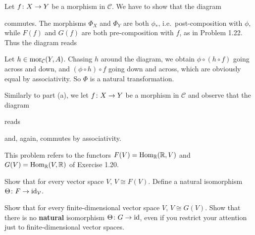 \bs
\ben[label=(\alph*)]
\item Let $f\colon X\to Y$ be a morphism in $\mathcal{C}$. We have to show that the diagram
\bse
{}
\ese
commutes. The morphisms $\Phi_X$ and $\Phi_Y$ are both $\phi_*$, i.e.\ post-composition with $\phi$, while $F(f)$ and $G(f)$ are both pre-composition with $f$, as in Problem 1.22. Thus the diagram reads
\bse
{}
\ese
Let $h\in\operatorname{mor}_{\mathcal{C}}(Y,A)$. Chasing $h$ around the diagram, we obtain $\phi\circ(h\circ f)$ going across and down, and $(\phi \circ h)\circ f$ going down and across, which are obviously equal by associativity. So $\Phi$ is a natural transformation.
\item Similarly to part (a), we let $f\colon X\to Y$ be a morphism in $\mathcal{C}$ and observe that the diagram
\bse
{}
\ese
reads
\bse
{}
\ese
and, again, commutes by associativity. 
\een
\es

\bx
This problem refers to the functors $F(V) = \operatorname{Hom}_{\mathbb{R}}(\mathbb{R},V)$ and $G(V) = \operatorname{Hom}_{\mathbb{R}}(V,\mathbb{R})$ of Exercise 1.20.
\ben[label=(\alph*)]
\item Show that for every vector space $V$, $V\cong F(V)$. Define a natural isomorphism $\Theta\colon F \to \mathrm{id}_{\mathcal{V}}$.
\item Show that for every finite-dimensional vector space $V$, $V\cong G(V)$. Show that there is no \textbf{natural} isomorphism $\Theta \colon G \to \mathrm{id}$, even if you restrict your attention just to finite-dimensional vector spaces.
\een
\ex

